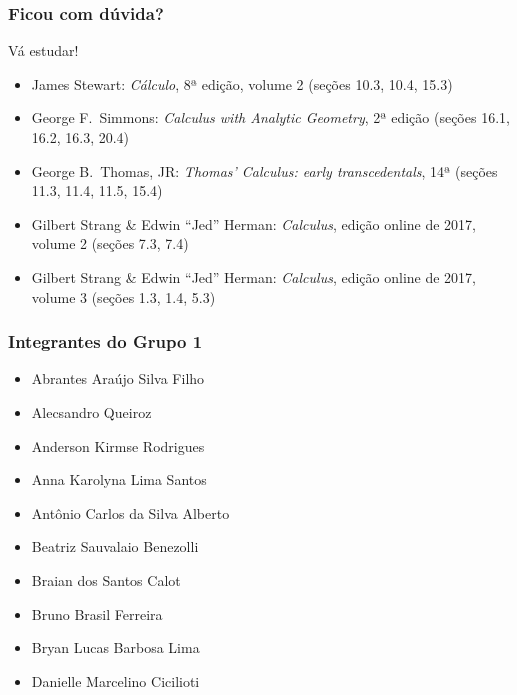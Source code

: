 \documentclass[pdftex, brazil, aspectratio=169]{beamer}
\begin{document}
\begin{frame}
\frametitle{Ficou com dúvida?}
\begin{center}
  \Huge Vá estudar!
  \vspace{1.6cm}
  \normalsize
  \begin{itemize}
    \item James Stewart: \emph{Cálculo}, 8ª edição, volume 2 (seções
      10.3, 10.4, 15.3)
    \item George F.\ Simmons: \emph{Calculus with Analytic Geometry},
      2ª edição (seções 16.1, 16.2, 16.3, 20.4)
    \item George B.\ Thomas, JR: \emph{Thomas' Calculus: early
      transcedentals}, 14ª (seções 11.3, 11.4, 11.5, 15.4)
    \item Gilbert Strang \& Edwin ``Jed'' Herman: \emph{Calculus},
      edição online de 2017, volume 2 (seções 7.3, 7.4)
    \item Gilbert Strang \& Edwin ``Jed'' Herman: \emph{Calculus},
      edição online de 2017, volume 3 (seções 1.3, 1.4, 5.3)
  \end{itemize}
\end{center}
\end{frame}

\begin{frame}
\frametitle{Integrantes do Grupo 1}
\begin{center}
  \begin{itemize}
  \item Abrantes Araújo Silva Filho
  \item Alecsandro Queiroz
  \item Anderson Kirmse Rodrigues
  \item Anna Karolyna Lima Santos
  \item Antônio Carlos da Silva Alberto
  \item Beatriz Sauvalaio Benezolli
  \item Braian dos Santos Calot
  \item Bruno Brasil Ferreira
  \item Bryan Lucas Barbosa Lima
  \item Danielle Marcelino Cicilioti
  \end{itemize}
\end{center}
\end{frame}

\end{document}
